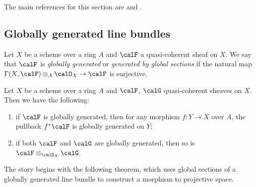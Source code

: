 The main references for this section are \cite{Har77} and \cite{Laz04a}.

\subsection{Globally generated line bundles}


    \begin{definition}\label{def:gbgs_quasi-coherent_sheaves}
        Let \(X\) be a scheme over a ring \(A\) and \(\calF\) a quasi-coherent sheaf on \(X\).
        We say that \(\calF\) is \emph{globally generated} or \emph{generated by global sections} if the natural map \(\Gamma(X,\calF)\otimes_A \calO_X \to \calF\) is surjective.
    \end{definition}

    \begin{proposition}\label{prop:gbgs_is_stable_under_pullback_tensor_product}
        Let \(X\) be a scheme over a ring \(A\) and \(\calF\), \(\calG\) quasi-coherent sheaves on \(X\).
        Then we have the following:
        \begin{enumerate}
            \item if \(\calF\) is globally generated, then for any morphism \(f:Y\to X\) over \(A\), the pullback \(f^*\calF\) is globally generated on \(Y\);
            \item if both \(\calF\) and \(\calG\) are globally generated, then so is \(\calF \otimes_{\calO_X} \calG\).
        \end{enumerate}
    \end{proposition}
    

        

    The story begins with the following theorem, which uses global sections of a globally generated line bundle to construct a morphism to projective space.

